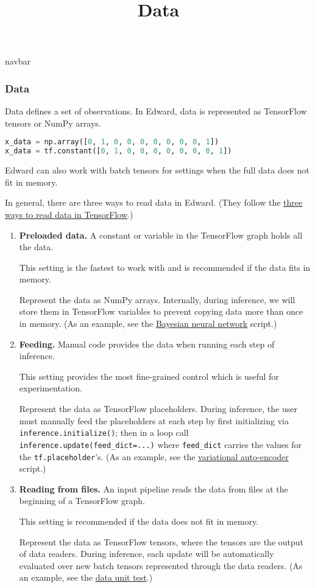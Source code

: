 \title{Data}

{{navbar}}

\subsubsection{Data}

Data defines a set of observations. In Edward, data is represented as
TensorFlow tensors or NumPy arrays.

\begin{lstlisting}[language=Python]
x_data = np.array([0, 1, 0, 0, 0, 0, 0, 0, 0, 1])
x_data = tf.constant([0, 1, 0, 0, 0, 0, 0, 0, 0, 1])
\end{lstlisting}

Edward can also work with batch tensors for settings when the full
data does not fit in memory.

In general, there are three ways to read data in Edward. (They follow
the \href{https://www.tensorflow.org/versions/master/how_tos/reading_data/index.html}
{three ways to read data in TensorFlow}.)

\begin{enumerate}
\item
   \textbf{Preloaded data.} A constant or variable in the TensorFlow graph
   holds all the data.

   This setting is the fastest to work with and is recommended if the
   data fits in memory.

   Represent the data as NumPy arrays.
   Internally, during inference, we will store them in TensorFlow variables to prevent
   copying data more than once in memory.
   (As an example, see
   the
   \href{https://github.com/blei-lab/edward/blob/master/examples/bayesian_nn.py}
   {Bayesian neural network} script.)
\item
   \textbf{Feeding.} Manual code provides the data when running each step of
   inference.

   This setting provides the most fine-grained control which is useful for experimentation.

   Represent the data as TensorFlow placeholders. During inference,
   the user must manually feed the placeholders at each
   step by first initializing via \texttt{inference.initialize()}; then
   in a loop call \texttt{inference.update(feed_dict={...})} where
   \texttt{feed_dict} carries the values for the \texttt{tf.placeholder}'s.
   (As an example, see
   the
   \href{https://github.com/blei-lab/edward/blob/master/examples/vae.py}
   {variational auto-encoder} script.)
\item
   \textbf{Reading from files.} An input pipeline reads the data from files
   at the beginning of a TensorFlow graph.

   This setting is recommended if the data does not fit in memory.

   Represent the data as TensorFlow tensors, where the tensors are the
   output of data readers. During inference, each update will be
   automatically evaluated over new batch tensors represented through
   the data readers. (As an example, see
   the
   \href{https://github.com/blei-lab/edward/blob/master/tests/test-inferences/test_data.py}
   {data unit test}.)
\end{enumerate}

